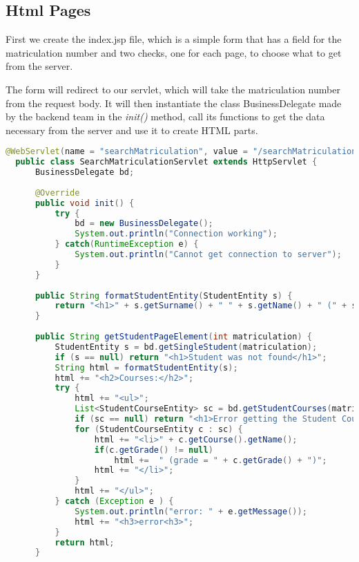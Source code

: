 \pagebreak
\subsection{Html Pages}
First we create the index.jsp file, which is a simple form that has a field for the matriculation number and two checks, one for each page, to choose what to get from the server.

The form will redirect to our servlet, which will take the matriculation number from the request body. It will then instantiate the class BusinessDelegate made by the backend team in the \textit{init()} method, call its functions to get the data necessary from the server and use it to create HTML parts.

\begin{lstlisting}[language=java, caption={SearchMatriculationServlet}]
  @WebServlet(name = "searchMatriculation", value = "/searchMatriculation")
  public class SearchMatriculationServlet extends HttpServlet {
      BusinessDelegate bd;
  
      @Override
      public void init() {
          try {
              bd = new BusinessDelegate();
              System.out.println("Connection working");
          } catch(RuntimeException e) {
              System.out.println("Cannot get connection to server");
          }
      }
  
      public String formatStudentEntity(StudentEntity s) {
          return "<h1>" + s.getSurname() + " " + s.getName() + " (" + s.getMatriculation() + ")</h1>";
      }
  
      public String getStudentPageElement(int matriculation) {
          StudentEntity s = bd.getSingleStudent(matriculation);
          if (s == null) return "<h1>Student was not found</h1>";
          String html = formatStudentEntity(s);
          html += "<h2>Courses:</h2>";
          try {
              html += "<ul>";
              List<StudentCourseEntity> sc = bd.getStudentCourses(matriculation);
              if (sc == null) return "<h1>Error getting the Student Courses</h1>";
              for (StudentCourseEntity c : sc) {
                  html += "<li>" + c.getCourse().getName();
                  if(c.getGrade() != null)
                      html +=  " (grade = " + c.getGrade() + ")";
                  html += "</li>";
              }
              html += "</ul>";
          } catch (Exception e ) {
              System.out.println("error: " + e.getMessage());
              html += "<h3>error<h3>";
          }
          return html;
      }
  

\end{lstlisting}
